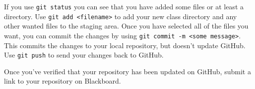 \documentclass[12pt]{article}
\newcommand{\code}[1]{\texttt{#1}}
\begin{document}
If you use \code {git status} you can see that you have added some files or at least a directory.
Use \code{git add <filename>} to add your new class directory and any other wanted files to the staging area.
Once you have selected all of the files you want, you can commit the changes by using \code{git commit -m <some message>}.
This commits the changes to your local repository, but doesn't update GitHub.
Use \code{git push} to send your changes back to GitHub.

Once you've verified that your repository has been updated on GitHub, submit a link to your repository on Blackboard.
\end{document}
